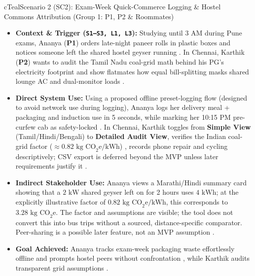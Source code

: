\documentclass[12pt, a4paper]{article}
\begin{document}
\begin{scenariocard}{cTeal}{Scenario 2 (SC2): Exam-Week Quick-Commerce Logging \& Hostel Commons Attribution (Group 1: P1, P2 \& Roommates)}
\footnotesize
\begin{itemize}
    \item \textbf{Context \& Trigger (\texttt{S1--S3, L1, L3}):} Studying until 3 AM during Pune exams, Ananya (\textbf{P1}) orders late-night paneer rolls in plastic boxes and notices someone left the shared hostel geyser running \cite{cf1}. In Chennai, Karthik (\textbf{P2}) wants to audit the Tamil Nadu coal-grid math behind his PG's electricity footprint and show flatmates how equal bill-splitting masks shared lounge AC and dual-monitor loads \cite{cf4, cf10}.
    \item \textbf{Direct System Use:} Using a proposed offline preset-logging flow (designed to avoid network use during logging), Ananya logs her delivery meal + packaging and induction use in 5 seconds, while marking her 10:15 PM pre-curfew cab as safety-locked \cite{cf1}. In Chennai, Karthik toggles from \textbf{Simple View} (Tamil/Hindi/Bengali) to \textbf{Detailed Audit View}, verifies the Indian coal-grid factor ($\approx 0.82\text{ kg CO}_2\text{e/kWh}$) \cite{lee2021, cf4}, records phone repair and cycling descriptively; CSV export is deferred beyond the MVP unless later requirements justify it \cite{cf4, cf7}.
    \item \textbf{Indirect Stakeholder Use:} Ananya views a Marathi/Hindi summary card showing that a $2\text{ kW}$ shared geyser left on for 2 hours uses $4\text{ kWh}$; at the explicitly illustrative factor of $0.82\text{ kg CO}_2\text{e/kWh}$, this corresponds to $3.28\text{ kg CO}_2\text{e}$. The factor and assumptions are visible; the tool does not convert this into bus trips without a sourced, distance-specific comparator. Peer-sharing is a possible later feature, not an MVP assumption \cite{cf1, lee2021}.
    \item \textbf{Goal Achieved:} Ananya tracks exam-week packaging waste effortlessly offline and prompts hostel peers without confrontation \cite{cf1}, while Karthik audits transparent grid assumptions \cite{cf4}.
\end{itemize}
\end{scenariocard}
\end{document}
